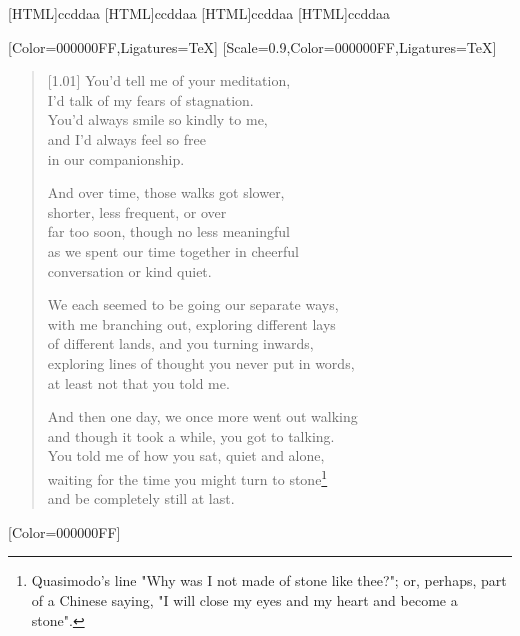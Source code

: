 [HTML]{ccddaa}
[HTML]{ccddaa}
[HTML]{ccddaa}
[HTML]{ccddaa}
\begin{paracol}{2}
  \begin{leftcolumn}
[Color=000000FF,Ligatures=TeX]
\renewfontfamily{}[Scale=0.9,Color=000000FF,Ligatures=TeX]

\begin{verse}[1.01\textwidth]
You'd tell me of your meditation,\\
I'd talk of my fears of stagnation.\\
You'd always smile so kindly to me,\\
and I'd always feel so free\\
in our companionship.

And over time, those walks got slower,\\
shorter, less frequent, or over\\
far too soon, though no less meaningful\\
as we spent our time together in cheerful\\
conversation or kind quiet.

We each seemed to be going our separate ways,\\
with me branching out, exploring different lays\\
of different lands, and you turning inwards,\\
exploring lines of thought you never put in words,\\
at least not that you told me.

And then one day, we once more went out walking\\
and though it took a while, you got to talking.\\
You told me of how  you sat, quiet and alone,\\
waiting for the time you might turn to stone\footnote{Quasimodo's line "Why was I not made of stone like thee?"; or, perhaps, part of a Chinese saying, "I will close my eyes and my heart and become a stone".}\\
and be completely still at last.
\end{verse}
\newpage
\end{leftcolumn}
\end{paracol}

\renewfontfamily{}[Color=000000FF]

